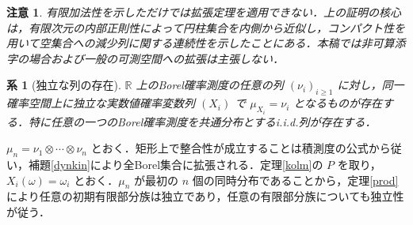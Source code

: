 \documentclass[a5paper,10pt,onecolumn]{jsarticle}
\makeatletter
\theoremstyle{mathnotetheorem}
\newtheorem{corollary}[theorem]{系}
\newtheorem{remark}[theorem]{注意}
\renewcommand{\proofname}{証明}
\renewenvironment{proof}[1][\proofname]{%
  \par\pushQED{\qed}\normalfont\topsep4\p@\@plus2\p@\relax
  \trivlist\item[\hskip\labelsep\bfseries #1]\ignorespaces
}{\popQED\endtrivlist\@endpefalse}
\newcommand{\R}{\mathbb{R}}
\newcommand{\1}{\mathbf{1}}
\makeatother
\begin{document}
\begin{remark}
有限加法性を示しただけでは拡張定理を適用できない．上の証明の核心は，有限次元の内部正則性によって円柱集合を内側から近似し，コンパクト性を用いて空集合への減少列に関する連続性を示したことにある．本稿では非可算添字の場合および一般の可測空間への拡張は主張しない．
\end{remark}
\begin{corollary}[独立な列の存在]\label{iid}
$\R$ 上のBorel確率測度の任意の列 $(\nu_i)_{i\ge1}$ に対し，同一確率空間上に独立な実数値確率変数列 $(X_i)$ で $\mu_{X_i}=\nu_i$ となるものが存在する．特に任意の一つのBorel確率測度を共通分布とするi.i.d.列が存在する．
\end{corollary}
\begin{proof}
$\mu_n=\nu_1\otimes\cdots\otimes\nu_n$ とおく．矩形上で整合性が成立することは積測度の公式から従い，補題\ref{dynkin}により全Borel集合に拡張される．定理\ref{kolm}の $P$ を取り，$X_i(\omega)=\omega_i$ とおく．$\mu_n$ が最初の $n$ 個の同時分布であることから，定理\ref{prod}により任意の初期有限部分族は独立であり，任意の有限部分族についても独立性が従う．
\end{proof}
\end{document}
